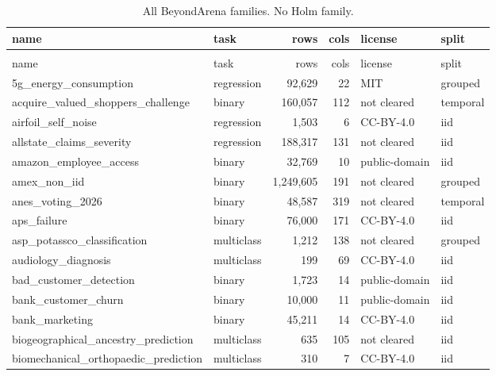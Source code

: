 \scriptsize
\begin{longtable}{>{\raggedright\arraybackslash}p{5.5cm}lrrll}
\caption{All \BeyondInventory{} BeyondArena families. No Holm family.}\\
\toprule
name & task & rows & cols & license & split\\
\midrule
\endfirsthead
\multicolumn{6}{l}{\tablename\ \thetable, continued}\\
\toprule
name & task & rows & cols & license & split\\
\midrule
\endhead
\bottomrule
\endfoot
5g\_\allowbreak{}energy\_\allowbreak{}consumption & regression & 92,629 & 22 & MIT & grouped\\
acquire\_\allowbreak{}valued\_\allowbreak{}shoppers\_\allowbreak{}challenge & binary & 160,057 & 112 & not cleared & temporal\\
airfoil\_\allowbreak{}self\_\allowbreak{}noise & regression & 1,503 & 6 & CC-BY-4.0 & iid\\
allstate\_\allowbreak{}claims\_\allowbreak{}severity & regression & 188,317 & 131 & not cleared & iid\\
amazon\_\allowbreak{}employee\_\allowbreak{}access & binary & 32,769 & 10 & public-domain & iid\\
amex\_\allowbreak{}non\_\allowbreak{}iid & binary & 1,249,605 & 191 & not cleared & grouped\\
anes\_\allowbreak{}voting\_\allowbreak{}2026 & binary & 48,587 & 319 & not cleared & temporal\\
aps\_\allowbreak{}failure & binary & 76,000 & 171 & CC-BY-4.0 & iid\\
asp\_\allowbreak{}potassco\_\allowbreak{}classification & multiclass & 1,212 & 138 & not cleared & grouped\\
audiology\_\allowbreak{}diagnosis & multiclass & 199 & 69 & CC-BY-4.0 & iid\\
bad\_\allowbreak{}customer\_\allowbreak{}detection & binary & 1,723 & 14 & public-domain & iid\\
bank\_\allowbreak{}customer\_\allowbreak{}churn & binary & 10,000 & 11 & public-domain & iid\\
bank\_\allowbreak{}marketing & binary & 45,211 & 14 & CC-BY-4.0 & iid\\
biogeographical\_\allowbreak{}ancestry\_\allowbreak{}prediction & multiclass & 635 & 105 & not cleared & iid\\
biomechanical\_\allowbreak{}orthopaedic\_\allowbreak{}prediction & multiclass & 310 & 7 & CC-BY-4.0 & iid\\

\end{longtable}
